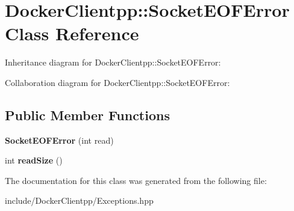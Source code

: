 \hypertarget{classDockerClientpp_1_1SocketEOFError}{}\section{Docker\+Clientpp\+::Socket\+E\+O\+F\+Error Class Reference}
\label{classDockerClientpp_1_1SocketEOFError}


Inheritance diagram for Docker\+Clientpp\+::Socket\+E\+O\+F\+Error\+:


Collaboration diagram for Docker\+Clientpp\+::Socket\+E\+O\+F\+Error\+:
\subsection*{Public Member Functions}
\begin{DoxyCompactItemize}
\item 
\mbox{\label{classDockerClientpp_1_1SocketEOFError_a3a90aa883bbc573826a435396efdb668}} 
{\bfseries Socket\+E\+O\+F\+Error} (int read)
\item 
\mbox{\label{classDockerClientpp_1_1SocketEOFError_ac5a71e755b60b8d63ac53ee5ad16bd1b}} 
int {\bfseries read\+Size} ()
\end{DoxyCompactItemize}


The documentation for this class was generated from the following file\+:\begin{DoxyCompactItemize}
\item 
include/\+Docker\+Clientpp/Exceptions.\+hpp\end{DoxyCompactItemize}
